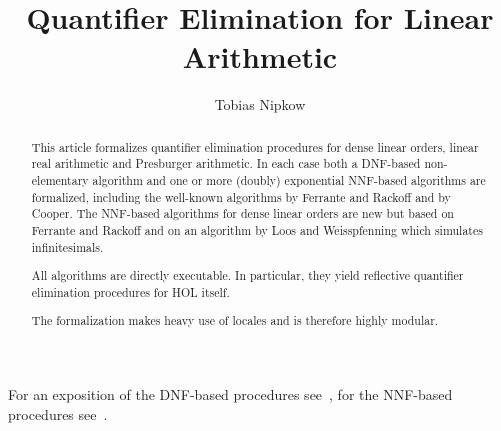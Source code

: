 \documentclass[11pt,a4paper]{article}
\begin{document}
\title{Quantifier Elimination for Linear Arithmetic}
\author{Tobias Nipkow}
\maketitle

\begin{abstract}
This article formalizes quantifier elimination procedures for dense
linear orders, linear real arithmetic and Presburger arithmetic.  In
each case both a DNF-based non-elementary algorithm and one or more
(doubly) exponential NNF-based algorithms are formalized, including
the well-known algorithms by Ferrante and Rackoff and by Cooper. The
NNF-based algorithms for dense linear orders are new but based on
Ferrante and Rackoff and on an algorithm by Loos and Weisspfenning
which simulates infinitesimals.

All algorithms are directly executable. In particular, they yield
reflective quantifier elimination procedures for HOL itself.

The formalization makes heavy use of locales and is therefore highly modular.
\end{abstract}

\noindent
For an exposition of the DNF-based procedures see~\cite{Nipkow-MOD2007},
for the NNF-based procedures see~\cite{Nipkow-IJCAR08}.
\tableofcontents





\end{document}
